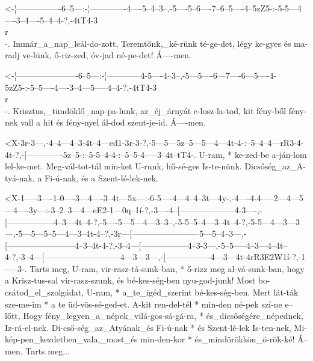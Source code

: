 
  {<-¦----------------6--5---:-¦-------------4----5--4--3--,-5----5--6----7--6--5----4--5zZ5-:-5-5---4----3--4----5--4--4-?,-4tT4-3\\r\\-.}
  {  Immár_a_nap_leál-do-zott, Teremtőnk,_ké-rünk té-ge-det, légy ke-gyes és ma-radj ve-lünk,  ő-riz-zed, óv-jad  né-pe-det! Á----men.}

  {<-¦----------------------6--5---:-¦------------4-5----4--3--,-5---5----6---7----6---5----4-5zZ5-:-5--5----4----3--4---5-----4--4-?,-4tT4-3\\r\\-.}
  {  Krisztus,_tündöklő_nap-pa-lunk, az_éj_árnyát e-losz-la-tod, kit fény-ből fény-nek vall a hit    és fény-nyel ál-dod szent-je-id.  Á----men.}



  {<X-3r-3---,-4--4---4--3-4t--4---ed1-3r-3-?,-5---5---5z--5---5---4---4t-4-:--5--4--4---rR3-4-4t-?,-[-------------5z--5-:--5-5--4-4-:--5--5-4-----3--4t--tT4-.}
  {   U-ram, * ke-zed-be a-ján-lom lel-ke-met. Meg-vál-tot-tál min-ket U-runk, hű-sé-ges Is-te-nünk. Dicsőség_az_A-tyá-nak, a Fi-ú-nak, és a Szent-lé-lek-nek.}

  {<X-1-----3----1-0----3---4----3--4t---5x---:-6-5----4---4--4--3t---4y-,-4----4-4-----2---4---5---4----3y---:-3--2--3---4---eE2-1---0q--1í-?,-3----4--[--------------------4-3----,-[-----------------4--3---4t--4-?,-5----5---5---4---3--3--,-5-5--5--4---3--4t--4-?,-5-5---4---3---3---,-5---5---5--5---4---3--4t-4--?,-3r---[------------------------5---5--4--3---,-[------------------------4--3--4t-4-?,-3--4---[-----------------4--3-3---,-5--5-----4--3---4--4t--4-?,-3--4---[---------------------------4---3---3---,-[----------------4---3---4t-4rR3E2W1í-?,-1-----3-.}
  {   Tarts meg, U-ram, vir-rasz-tá-sunk-ban, * ő-rizz meg al-vá-sunk-ban, hogy a Krisz-tus-sal vir-rasz-szunk, és bé-kes-ség-ben nyu-god-junk! Most bo-csátod_el_szolgádat, U-ram, * a_te_igéd_szerint bé-kes-ség-ben. Mert lát-ták sze-me-im * a te üd-vös-sé-ged-et.  A-kit ren-del-tél * min-den né-pek szí-ne e--lőtt, Hogy fény_legyen_a_népek_vilá-gos-sá-gá-ra, * és_dicsőségére_népednek, Iz-rá-el-nek. Di-cső-ség_az_Atyának_és Fi-ú-nak * és Szent-lé-lek Is-ten-nek, Mi-kép-pen_kezdetben_vala,_most_és min-den-kor * és_mindörökkön_ö-rök-ké! Á--men.         Tarts meg...}

